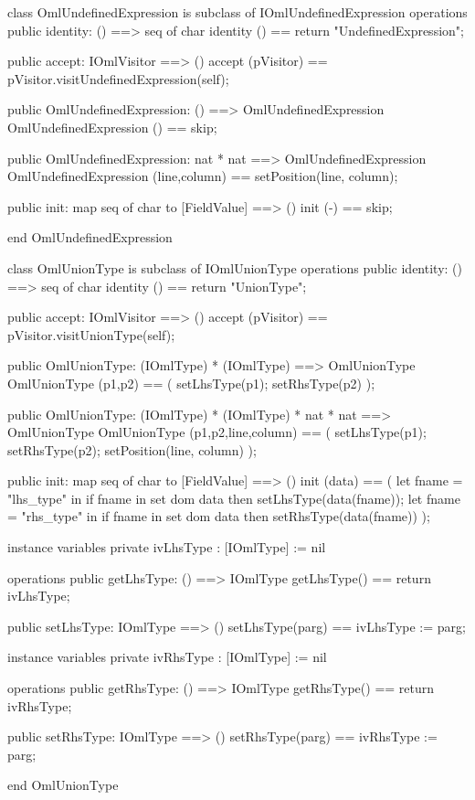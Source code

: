 \begin{vdm_al}
class OmlUndefinedExpression is subclass of IOmlUndefinedExpression
operations
  public identity: () ==> seq of char
  identity () == return "UndefinedExpression";

  public accept: IOmlVisitor ==> ()
  accept (pVisitor) == pVisitor.visitUndefinedExpression(self);

  public OmlUndefinedExpression:
    () ==> OmlUndefinedExpression
  OmlUndefinedExpression () == 
    skip;

  public OmlUndefinedExpression:
    nat *
    nat ==> OmlUndefinedExpression
  OmlUndefinedExpression (line,column) == 
    setPosition(line, column);

  public init: map seq of char to [FieldValue] ==> ()
  init (-) == skip;

end OmlUndefinedExpression
\end{vdm_al}

\begin{vdm_al}
class OmlUnionType is subclass of IOmlUnionType
operations
  public identity: () ==> seq of char
  identity () == return "UnionType";

  public accept: IOmlVisitor ==> ()
  accept (pVisitor) == pVisitor.visitUnionType(self);

  public OmlUnionType:
    (IOmlType) *
    (IOmlType) ==> OmlUnionType
  OmlUnionType (p1,p2) == 
    ( setLhsType(p1);
      setRhsType(p2) );

  public OmlUnionType:
    (IOmlType) *
    (IOmlType) *
    nat *
    nat ==> OmlUnionType
  OmlUnionType (p1,p2,line,column) == 
    ( setLhsType(p1);
      setRhsType(p2);
      setPosition(line, column) );

  public init: map seq of char to [FieldValue] ==> ()
  init (data) ==
    ( let fname = "lhs_type" in
        if fname in set dom data
        then setLhsType(data(fname));
      let fname = "rhs_type" in
        if fname in set dom data
        then setRhsType(data(fname)) );

instance variables
  private ivLhsType : [IOmlType] := nil

operations
  public getLhsType: () ==> IOmlType
  getLhsType() == return ivLhsType;

  public setLhsType: IOmlType ==> ()
  setLhsType(parg) == ivLhsType := parg;

instance variables
  private ivRhsType : [IOmlType] := nil

operations
  public getRhsType: () ==> IOmlType
  getRhsType() == return ivRhsType;

  public setRhsType: IOmlType ==> ()
  setRhsType(parg) == ivRhsType := parg;

end OmlUnionType
\end{vdm_al}

